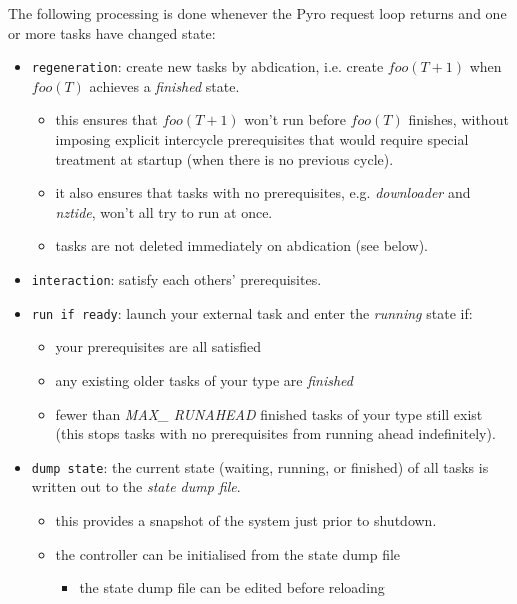 \documentclass[12pt]{amsart}
\begin{document}
The following processing is done whenever the Pyro request loop returns
and one or more tasks have changed state: 

    \begin{itemize} 
    \item \verb#regeneration#: create new tasks by abdication, i.e.
    create $foo(T+1)$ when $foo(T)$ achieves a {\em finished} state.
    \begin{itemize}
    \item this ensures that $foo(T+1)$ won't run before $foo(T)$
    finishes, without imposing explicit intercycle prerequisites
    that would require special treatment at startup (when there is no
    previous cycle). 
    \item it also ensures that tasks with no prerequisites, e.g.
    {\em downloader} and {\em nztide}, won't all try to run at once.
    \item tasks are not deleted immediately on abdication (see below). 
    \end{itemize}


    \item \verb#interaction#: satisfy each others' prerequisites. 

    \item \verb#run if ready#: launch your external task and enter the
    {\em running} state if:
        \begin{itemize}
        \item your prerequisites are all satisfied
        \item any existing older tasks of your type are {\em finished} 
        \item fewer than {\em MAX\_ RUNAHEAD} finished tasks of your
        type still exist (this stops tasks with no prerequisites from
        running ahead indefinitely).
        \end{itemize}

    \item \verb#dump state#: the current state (waiting, running, or
    finished) of all tasks is written out to the {\em state dump file}.
        \begin{itemize}
        \item this provides a snapshot of the system just prior to shutdown.

        \item the controller can be initialised from the state dump file
            \begin{itemize}
            \item the state dump file can be edited before reloading


\end{itemize}
\end{itemize}
\end{itemize}
\end{document}
